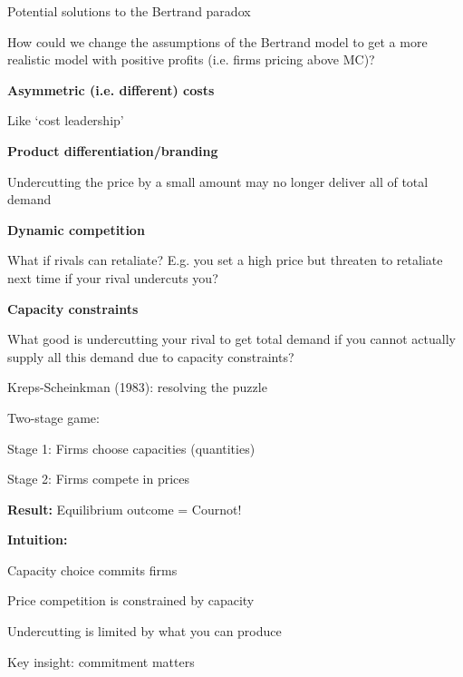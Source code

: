 \documentclass[notes,11pt, aspectratio=169]{beamer}
\newenvironment{wideitemize}{\itemize\addtolength{\itemsep}{10pt}}{\enditemize}
\newenvironment{wideenumerate}{\enumerate\addtolength{\itemsep}{10pt}}{\endenumerate}
\begin{document}
\begin{frame}{Potential solutions to the Bertrand paradox}
	\begin{wideitemize}
		\item How could we change the assumptions of the Bertrand model to get a more realistic model with positive profits (i.e. firms pricing above MC)?
		\item \textbf{Asymmetric (i.e. different) costs}
		\begin{wideitemize}
			\item Like `cost leadership'
		\end{wideitemize}
		\item \textbf{Product differentiation/branding}
		\begin{wideitemize}
			\item Undercutting the price by a small amount may no longer deliver all of total demand
		\end{wideitemize}
		\item \textbf{Dynamic competition}
		\begin{wideitemize}
			\item What if rivals can retaliate? E.g. you set a high price but threaten to retaliate next time if your rival undercuts you?
		\end{wideitemize}
		\item \textbf{Capacity constraints}
		\begin{wideitemize}
			\item What good is undercutting your rival to get total demand if you cannot actually supply all this demand due to capacity constraints?
		\end{wideitemize}
	\end{wideitemize}
\end{frame}

\begin{frame}{Kreps-Scheinkman (1983): resolving the puzzle}
	\begin{wideitemize}
		\item Two-stage game:
		\begin{wideenumerate}
			\vspace{5pt}
			\item Stage 1: Firms choose capacities (quantities)
			\item Stage 2: Firms compete in prices
		\end{wideenumerate}
		\item \textbf{Result:} Equilibrium outcome = Cournot!
		\item \textbf{Intuition:}
		\begin{wideitemize}
			\vspace{5pt}
			\item Capacity choice commits firms
			\item Price competition is constrained by capacity
			\item Undercutting is limited by what you can produce
		\end{wideitemize}
		\item Key insight: commitment matters
	\end{wideitemize}
\end{frame}
\end{document}

